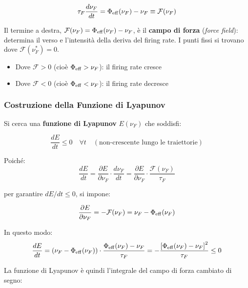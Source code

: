 \begin{equation}
\tau_F \frac{d\nu_F}{dt} = \Phi_{\rm eff}(\nu_F) - \nu_F \equiv \mathcal{F}(\nu_F)
\end{equation}

Il termine a destra, $\mathcal{F}(\nu_F) = \Phi_{\rm eff}(\nu_F) - \nu_F$, è il \textbf{campo di forza} (\textit{force field}): determina il verso e l'intensità della deriva del firing rate. I punti fissi si trovano dove $\mathcal{F}(\nu_F^*) = 0$.

\begin{itemize}
    \item Dove $\mathcal{F} > 0$ (cioè $\Phi_{\rm eff} > \nu_F$): il firing rate cresce
    \item Dove $\mathcal{F} < 0$ (cioè $\Phi_{\rm eff} < \nu_F$): il firing rate decresce
\end{itemize}

\subsubsection{Costruzione della Funzione di Lyapunov}

Si cerca una \textbf{funzione di Lyapunov} $E(\nu_F)$ che soddisfi:

\begin{equation}
\frac{dE}{dt} \leq 0 \quad \forall t \quad (\text{non-crescente lungo le traiettorie})
\end{equation}

Poiché:
\begin{equation}
\frac{dE}{dt} = \frac{\partial E}{\partial \nu_F} \cdot \frac{d\nu_F}{dt} = \frac{\partial E}{\partial \nu_F} \cdot \frac{\mathcal{F}(\nu_F)}{\tau_F}
\end{equation}

per garantire $dE/dt \leq 0$, si impone:

\begin{equation}
\frac{\partial E}{\partial \nu_F} = -\mathcal{F}(\nu_F) = \nu_F - \Phi_{\rm eff}(\nu_F)
\end{equation}

In questo modo:
\begin{equation}
\frac{dE}{dt} = \left(\nu_F - \Phi_{\rm eff}(\nu_F)\right) \cdot \frac{\Phi_{\rm eff}(\nu_F) - \nu_F}{\tau_F} = -\frac{\left[\Phi_{\rm eff}(\nu_F) - \nu_F\right]^2}{\tau_F} \leq 0
\end{equation}

La funzione di Lyapunov è quindi l'integrale del campo di forza cambiato di segno:

